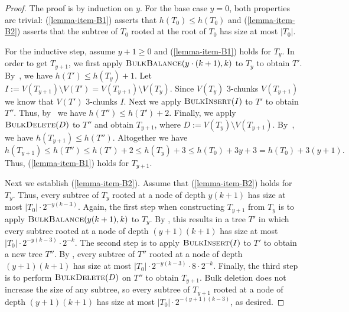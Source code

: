 \documentclass[kpfonts]{patmorin}
\let\le\leqslant
\let\ge\geqslant
\newcommand{\itemref}[1]{(\ref{#1})}
\begin{document}
\begin{proof}
The proof is by induction on $y$.  For the base case $y=0$, both properties are trivial: \itemref{lemma-item-B1} asserts that $h(T_0)\le h(T_0)$ and \itemref{lemma-item-B2} asserts that the subtree of $T_0$ rooted at the root of $T_0$ has size at most $|T_0|$.

  For the inductive step, assume $y+1\ge 0$ and \itemref{lemma-item-B1} holds for $T_{y}$.
  In order to get $T_{y+1}$, we first apply $\textsc{BulkBalance}(y\cdot (k+1),k)$ to $T_y$ to obtain $T'$.
  By~, we have $h(T') \le h(T_y)+1$.
  Let $I:=V(T_{y+1})\setminus V(T') = V(T_{y+1})\setminus V(T_y)$.
  Since $V(T_y)$ $3$-chunks $V(T_{y+1})$ we know that $V(T')$ $3$-chunks $I$.
  Next we apply $\textsc{BulkInsert}(I)$ to $T'$ to obtain $T''$.
  Thus, by~ we have $h(T'') \le h(T')+2$.
  Finally, we apply $\textsc{BulkDelete}(D)$ to $T''$ and obtain $T_{y+1}$, where $D:=V(T_{y})\setminus V(T_{y+1})$.
  By~, we have $h(T_{y+1}) \le h(T'')$.
  Altogether we have
  \[
  h(T_{y+1}) \le h(T'') \le h(T') +2 \le h(T_y) +3 \le h(T_0) + 3y +3 = h(T_0) + 3(y+1).
  \]
  Thus, \itemref{lemma-item-B1} holds for $T_{y+1}$.

    Next we establish \itemref{lemma-item-B2}.
    Assume that \itemref{lemma-item-B2} holds for $T_{y}$.
    Thus, every subtree of $T_{y}$ rooted at a node of depth $y(k+1)$ has size at most $|T_{0}|\cdot2^{-y(k-3)}$.
    Again, the first step when constructing $T_{y+1}$ from $T_{y}$ is to apply $\textsc{BulkBalance}(y(k+1),k)$ to $T_{y}$.  By , this results in a tree $T'$ in which every subtree rooted at a node of depth $(y+1)(k+1)$ has size at most $|T_{0}|\cdot 2^{-y(k-3)}\cdot 2^{-k}$.  The second step is to apply $\textsc{BulkInsert}(I)$ to $T'$ to obtain a new tree $T''$.
    By , every subtree of $T''$ rooted at a node of depth $(y+1)(k+1)$ has size at most $|T_{0}|\cdot 2^{-y(k-3)}\cdot 8 \cdot 2^{-k}$.  Finally, the third step is to perform $\textsc{BulkDelete}(D)$ on $T''$ to obtain $T_{y+1}$.  Bulk deletion does not increase the size of any subtree, so every subtree of $T_{y+1}$ rooted at a node of depth $(y+1)(k+1)$ has size at most $|T_{0}|\cdot 2^{-(y+1)(k-3)}$, as desired.
\end{proof}
\end{document}

